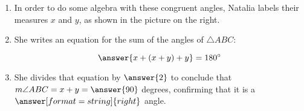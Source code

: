 \documentclass[handout,nooutcomes]{ximera}
\begin{document}
\begin{problem}
\begin{enumerate}
\item In order to do some algebra with these congruent angles, Natalia labels their measures $x$ and $y$, as shown in the picture on the right.  

\item She writes an equation for the sum of the angles of $\triangle ABC$: 

\[
\answer{x+(x+y)+y} = 180^\circ
\]

\item She divides that equation by $\answer{2}$ to conclude that $m\angle ABC = x+y = \answer{90}$ degrees, confirming that it is a
$\answer[format=string]{right}$ angle.  

\end{enumerate}
\end{problem}
\end{document}
